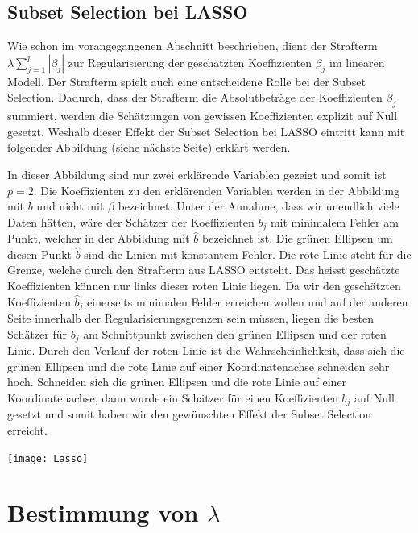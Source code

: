 \documentclass[]{book}
\begin{document}
\subsection{Subset Selection bei
LASSO}\label{subset-selection-bei-lasso}

Wie schon im vorangegangenen Abschnitt beschrieben, dient der Strafterm
\(\lambda\sum_{j=1}^p|\beta_j|\) zur Regularisierung der geschätzten
Koeffizienten \(\beta_j\) im linearen Modell. Der Strafterm spielt auch
eine entscheidene Rolle bei der Subset Selection. Dadurch, dass der
Strafterm die Absolutbeträge der Koeffizienten \(\beta_j\) summiert,
werden die Schätzungen von gewissen Koeffizienten explizit auf Null
gesetzt. Weshalb dieser Effekt der Subset Selection bei LASSO eintritt
kann mit folgender Abbildung (siehe nächste Seite) erklärt werden.

In dieser Abbildung sind nur zwei erklärende Variablen gezeigt und somit
ist \(p=2\). Die Koeffizienten zu den erklärenden Variablen werden in
der Abbildung mit \(b\) und nicht mit \(\beta\) bezeichnet. Unter der
Annahme, dass wir unendlich viele Daten hätten, wäre der Schätzer der
Koeffizienten \(b_j\) mit minimalem Fehler am Punkt, welcher in der
Abbildung mit \(\hat{b}\) bezeichnet ist. Die grünen Ellipsen um diesen
Punkt \(\hat{b}\) sind die Linien mit konstantem Fehler. Die rote Linie
steht für die Grenze, welche durch den Strafterm aus LASSO entsteht. Das
heisst geschätzte Koeffizienten können nur links dieser roten Linie
liegen. Da wir den geschätzten Koeffizienten \(\hat{b}_j\) einerseits
minimalen Fehler erreichen wollen und auf der anderen Seite innerhalb
der Regularisierungsgrenzen sein müssen, liegen die besten Schätzer für
\(b_j\) am Schnittpunkt zwischen den grünen Ellipsen und der roten
Linie. Durch den Verlauf der roten Linie ist die Wahrscheinlichkeit,
dass sich die grünen Ellipsen und die rote Linie auf einer
Koordinatenachse schneiden sehr hoch. Schneiden sich die grünen Ellipsen
und die rote Linie auf einer Koordinatenachse, dann wurde ein Schätzer
für einen Koeffizienten \(b_j\) auf Null gesetzt und somit haben wir den
gewünschten Effekt der Subset Selection erreicht.

\begin{center}\texttt{[image: Lasso]} \end{center}

\section{\texorpdfstring{Bestimmung von
\(\lambda\)}{Bestimmung von \textbackslash{}lambda}}\label{bestimmung-von-lambda}
\end{document}
